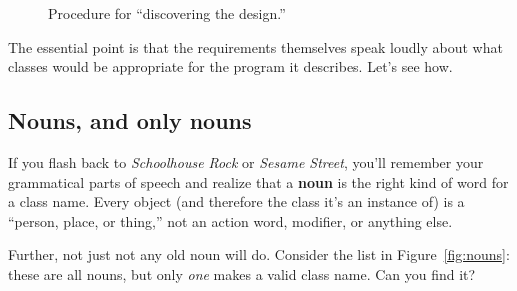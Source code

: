 \setlength{\fboxsep}{10pt}
\begin{figure}
\centering
{}
\vspace{.1in}
\caption{Procedure for ``discovering the design.''}
\label{fig:discovering}
\end{figure}

The essential point is that the requirements themselves speak loudly about
what classes would be appropriate for the program it describes. Let's see how.

\subsection{Nouns, and only nouns}

If you flash back to \textit{Schoolhouse Rock} or \textit{Sesame Street},
you'll remember your grammatical parts of speech and realize that a
\textbf{noun} is the right kind of word for a class name. Every object (and
therefore the class it's an instance of) is a ``person, place, or thing,'' not
an action word, modifier, or anything else.

Further, not just not any old noun will do. Consider the list in
Figure~\ref{fig:nouns}: these are all nouns, but only \textit{one} makes a
valid class name. Can you find it?

